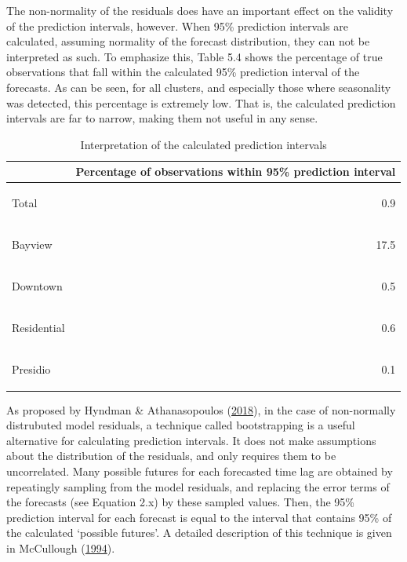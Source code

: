 \documentclass[12pt,oneside]{reedthesis}
\begin{document}
The non-normality of the residuals does have an important effect on the
validity of the prediction intervals, however. When 95\% prediction
intervals are calculated, assuming normality of the forecast
distribution, they can not be interpreted as such. To emphasize this,
Table 5.4 shows the percentage of true observations that fall within the
calculated 95\% prediction interval of the forecasts. As can be seen,
for all clusters, and especially those where seasonality was detected,
this percentage is extremely low. That is, the calculated prediction
intervals are far to narrow, making them not useful in any sense.
\begin{table}[H]

\caption{\label{tab:intervalcheck}Interpretation of the calculated prediction intervals}
\centering
\begin{tabular}{>{\bfseries\raggedright\arraybackslash}p{4cm}r}
\toprule
  & Percentage of observations within 95\% prediction interval\\
\midrule
\rowcolor{gray!6}  Total & 0.9\\
Bayview & 17.5\\
\rowcolor{gray!6}  Downtown & 0.5\\
Residential & 0.6\\
\rowcolor{gray!6}  Presidio & 0.1\\
\bottomrule
\end{tabular}
\end{table}
As proposed by Hyndman \& Athanasopoulos
(\protect\hyperlink{ref-hyndman2018fpp}{2018}), in the case of
non-normally distrubuted model residuals, a technique called
bootstrapping is a useful alternative for calculating prediction
intervals. It does not make assumptions about the distribution of the
residuals, and only requires them to be uncorrelated. Many possible
futures for each forecasted time lag are obtained by repeatingly
sampling from the model residuals, and replacing the error terms of the
forecasts (see Equation 2.x) by these sampled values. Then, the 95\%
prediction interval for each forecast is equal to the interval that
contains 95\% of the calculated `possible futures'. A detailed
description of this technique is given in McCullough
(\protect\hyperlink{ref-mccullough1994}{1994}).
\end{document}
